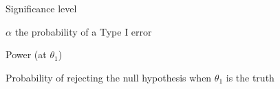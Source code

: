 \documentclass[12pt]{article}
\begin{document}
\begin{note}
    \begin{field}
        Significance level
    \end{field}
    \begin{field}
        $\alpha$ the probability of a Type I error
    \end{field}
\end{note}

\begin{note}
    \begin{field}
        Power (at $\theta_1$)
    \end{field}
    \begin{field}
        Probability of rejecting the null hypothesis when $\theta_1$ is the truth
    \end{field}
\end{note}
\end{document}
